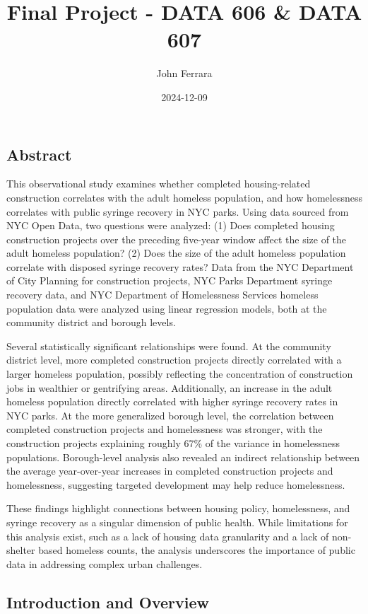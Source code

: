 \documentclass[
]{article}
\title{Final Project - DATA 606 \& DATA 607}
\author{John Ferrara}
\date{2024-12-09}
\begin{document}
\maketitle

\subsection{Abstract}\label{abstract}

This observational study examines whether completed housing-related
construction correlates with the adult homeless population, and how
homelessness correlates with public syringe recovery in NYC parks. Using
data sourced from NYC Open Data, two questions were analyzed: (1) Does
completed housing construction projects over the preceding five-year
window affect the size of the adult homeless population? (2) Does the
size of the adult homeless population correlate with disposed syringe
recovery rates? Data from the NYC Department of City Planning for
construction projects, NYC Parks Department syringe recovery data, and
NYC Department of Homelessness Services homeless population data were
analyzed using linear regression models, both at the community district
and borough levels.

Several statistically significant relationships were found. At the
community district level, more completed construction projects directly
correlated with a larger homeless population, possibly reflecting the
concentration of construction jobs in wealthier or gentrifying areas.
Additionally, an increase in the adult homeless population directly
correlated with higher syringe recovery rates in NYC parks. At the more
generalized borough level, the correlation between completed
construction projects and homelessness was stronger, with the
construction projects explaining roughly 67\% of the variance in
homelessness populations. Borough-level analysis also revealed an
indirect relationship between the average year-over-year increases in
completed construction projects and homelessness, suggesting targeted
development may help reduce homelessness.

These findings highlight connections between housing policy,
homelessness, and syringe recovery as a singular dimension of public
health. While limitations for this analysis exist, such as a lack of
housing data granularity and a lack of non-shelter based homeless
counts, the analysis underscores the importance of public data in
addressing complex urban challenges.

\subsection{Introduction and Overview}\label{introduction-and-overview}
\end{document}
